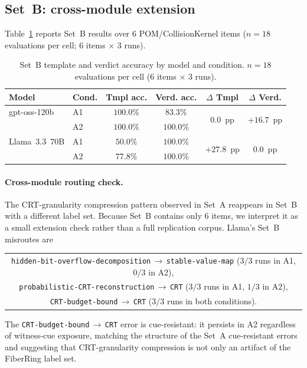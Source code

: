 \documentclass[11pt]{article}
\begin{document}
\subsection{Set~B: cross-module extension}
\label{sec:results:setb}

Table~\ref{tab:setb} reports Set~B results over 6 POM/CollisionKernel items
($n = 18$ evaluations per cell; $6$ items $\times$ $3$ runs).

\begin{table}[htbp]
\centering
\caption{Set~B template and verdict accuracy by model and condition.
         $n = 18$ evaluations per cell (6 items $\times$ 3 runs).}
\label{tab:setb}
\begin{tabular}{llcccc}
\toprule
\textbf{Model} & \textbf{Cond.}
  & \textbf{Tmpl acc.} & \textbf{Verd. acc.}
  & \textbf{$\Delta$ Tmpl} & \textbf{$\Delta$ Verd.} \\
\midrule
gpt-oss-120b  & A1 & $100.0\%$ & $83.3\%$ & \multirow{2}{*}{$0.0$~pp} & \multirow{2}{*}{$+16.7$~pp} \\
              & A2 & $100.0\%$ & $100.0\%$ & & \\
\midrule
Llama~3.3~70B & A1 & $50.0\%$ & $100.0\%$ & \multirow{2}{*}{$+27.8$~pp} & \multirow{2}{*}{$0.0$~pp} \\
              & A2 & $77.8\%$ & $100.0\%$ & & \\
\bottomrule
\end{tabular}
\end{table}

\paragraph{Cross-module routing check.}
The CRT-granularity compression pattern observed in Set~A reappears in
Set~B with a different label set. Because Set~B contains only 6 items, we
interpret it as a small extension check rather than a full replication corpus.
Llama's Set~B misroutes are
\begin{center}
\begin{tabular}{c}
\texttt{hidden{-}bit{-}overflow{-}decomposition}\,$\to$\,\texttt{stable{-}value{-}map}
($3/3$ runs in A1, $0/3$ in A2),\\
\texttt{probabilistic{-}CRT{-}reconstruction}\,$\to$\,\texttt{CRT}
($3/3$ runs in A1, $1/3$ in A2),\\
\texttt{CRT{-}budget{-}bound}\,$\to$\,\texttt{CRT}
($3/3$ runs in both conditions).
\end{tabular}
\end{center}
The \texttt{CRT{-}budget{-}bound}\,$\to$\,\texttt{CRT} error is cue-resistant:
it persists in A2 regardless of witness-cue exposure, matching the structure
of the Set~A cue-resistant errors and suggesting that CRT-granularity
compression is not only an artifact of the FiberRing label set.
\end{document}
